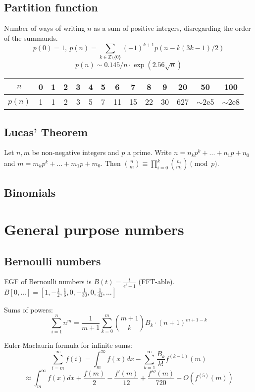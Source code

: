 \subsection{Partition function}
		Number of ways of writing $n$ as a sum of positive integers, disregarding the order of the summands.
		\[ p(0) = 1,\ p(n) = \sum_{k \in \mathbb Z \setminus \{0\}}{(-1)^{k+1} p(n - k(3k-1) / 2)} \]
		\[ p(n) \sim 0.145 / n \cdot \exp(2.56 \sqrt{n}) \]

		\begin{center}
		\begin{tabular}{c|c@{\ }c@{\ }c@{\ }c@{\ }c@{\ }c@{\ }c@{\ }c@{\ }c@{\ }c@{\ }c@{\ }c@{\ }c}
			$n$    & 0 & 1 & 2 & 3 & 4 & 5 & 6  & 7  & 8  & 9  & 20  & 50  & 100 \\ \hline
			$p(n)$ & 1 & 1 & 2 & 3 & 5 & 7 & 11 & 15 & 22 & 30 & 627 & $\mathtt{\sim}$2e5 & $\mathtt{\sim}$2e8 \\
		\end{tabular}
		\end{center}

	\subsection{Lucas' Theorem}
		Let $n,m$ be non-negative integers and $p$ a prime. Write $n=n_kp^k+...+n_1p+n_0$ and $m=m_kp^k+...+m_1p+m_0$. Then $\binom{n}{m} \equiv \prod_{i=0}^k\binom{n_i}{m_i} \pmod{p}$.

	\subsection{Binomials}

\section{General purpose numbers}
	\subsection{Bernoulli numbers}
		EGF of Bernoulli numbers is $B(t)=\frac{t}{e^t-1}$ (FFT-able).
		$B[0,\ldots] = [1, -\frac{1}{2}, \frac{1}{6}, 0, -\frac{1}{30}, 0, \frac{1}{42}, \ldots]$

		Sums of powers:
		\small
		\[ \sum_{i=1}^n n^m = \frac{1}{m+1} \sum_{k=0}^m \binom{m+1}{k} B_k \cdot (n+1)^{m+1-k} \]
		\normalsize

		Euler-Maclaurin formula for infinite sums:
		\small
		\[ \sum_{i=m}^{\infty} f(i) = \int_m^\infty f(x) dx - \sum_{k=1}^\infty \frac{B_k}{k!}f^{(k-1)}(m) \]
		\[ \approx \int_{m}^\infty f(x)dx + \frac{f(m)}{2} - \frac{f'(m)}{12} + \frac{f'''(m)}{720} + O(f^{(5)}(m)) \]
		\normalsize

